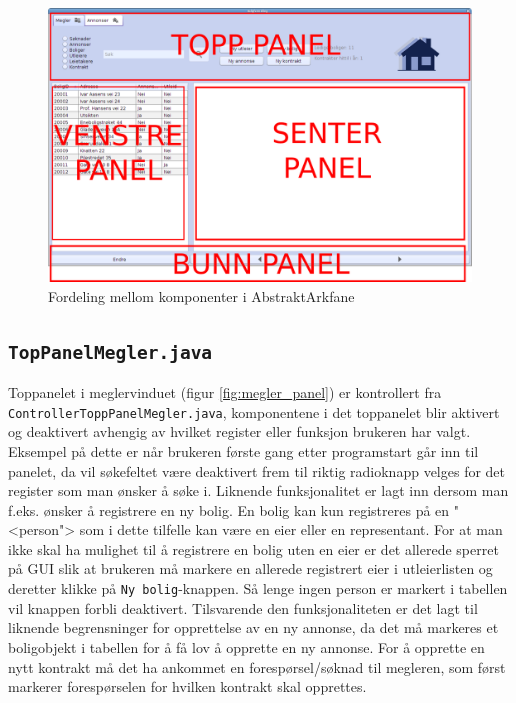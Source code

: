 \begin{figure}[ht]
 \includegraphics[width=\textwidth,height=\textheight,keepaspectratio]{./img/produktdokumentasjon/swing_componenter/AbstraktArkfane.png}
 \caption{Fordeling mellom komponenter i AbstraktArkfane}
 \label{fig:asbtarkfane}
\end{figure}



\subsection{\texttt{TopPanelMegler.java}} \label{subsec:meglerpanel}
Toppanelet i meglervinduet (figur \ref{fig:megler_panel}) er kontrollert fra \texttt{ControllerToppPanelMegler.java}, komponentene i det toppanelet blir aktivert og deaktivert avhengig av hvilket register eller funksjon brukeren har valgt. Eksempel på dette er når brukeren første gang etter programstart går inn til panelet, da vil søkefeltet være deaktivert frem til riktig radioknapp velges for det register som man ønsker å søke i. Liknende funksjonalitet er lagt inn dersom man f.eks. ønsker å registrere en ny bolig. En bolig kan kun registreres på en "<person"> som i dette tilfelle kan være en eier eller en representant. For at man ikke skal ha mulighet til å registrere en bolig uten en eier er det allerede sperret på GUI slik at brukeren må markere en allerede registrert eier i utleierlisten og deretter klikke på \texttt{Ny bolig}-knappen. Så lenge ingen person er markert i tabellen vil knappen forbli deaktivert. Tilsvarende den funksjonaliteten er det lagt til liknende begrensninger for opprettelse av en ny annonse, da det må markeres et boligobjekt i tabellen for å få lov å opprette en ny annonse. For å opprette en nytt kontrakt må det ha ankommet en forespørsel/søknad til megleren, som først markerer forespørselen for hvilken kontrakt skal opprettes. 

